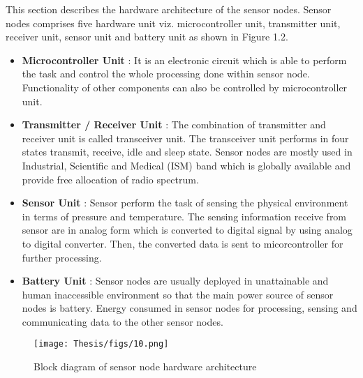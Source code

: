 This section describes the hardware architecture of the sensor nodes. Sensor nodes comprises five hardware unit viz. microcontroller unit, transmitter unit, receiver unit, sensor unit and battery unit as shown in Figure 1.2.
\begin{itemize}
    \item \textbf{Microcontroller Unit} : It is an electronic circuit which is able to perform the task and control the whole processing done within sensor node. Functionality of other components can also be controlled by microcontroller unit.
    \item \textbf{Transmitter / Receiver Unit} : The combination of transmitter and receiver unit is called transceiver unit. The transceiver unit performs in four states transmit, receive, idle and sleep state. Sensor nodes are mostly used in Industrial, Scientific and Medical (ISM) band which is globally available and provide free allocation of radio spectrum.
    \item \textbf{Sensor Unit} : Sensor perform the task of sensing the physical environment in terms of pressure and temperature. The sensing information receive from sensor are in analog form which is converted to digital signal by using analog to digital converter. Then, the converted data is sent to micorcontroller for further processing.
    \item \textbf{Battery Unit} : Sensor nodes are usually deployed in unattainable and human inaccessible environment so that the main power source of sensor nodes is battery. Energy consumed in sensor nodes for processing, sensing and communicating data to the other sensor nodes.
\end{itemize}
\begin{figure}[h!]
    \centering
    \texttt{[image: Thesis/figs/10.png]}
    \caption{Block diagram of sensor node hardware architecture}
    \label{fig:my_label}
\end{figure}
